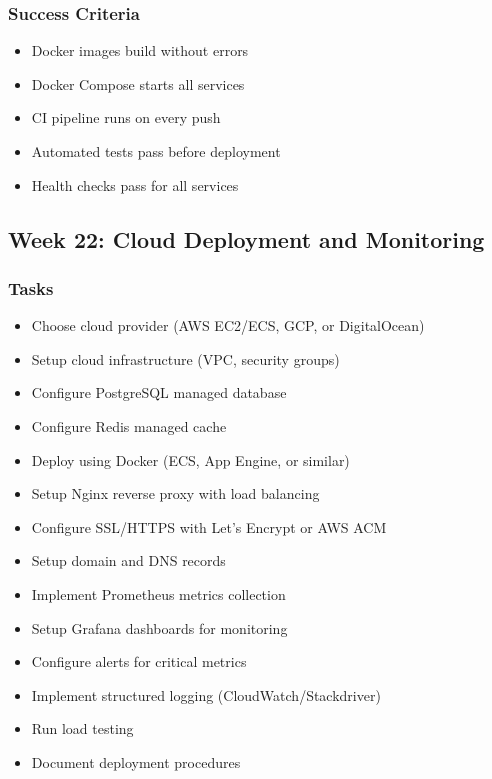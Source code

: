 \documentclass[12pt,oneside]{report}
\begin{document}
\subsubsection{Success Criteria}

\begin{itemize}
    \item Docker images build without errors
    \item Docker Compose starts all services
    \item CI pipeline runs on every push
    \item Automated tests pass before deployment
    \item Health checks pass for all services
\end{itemize}

\subsection{Week 22: Cloud Deployment and Monitoring}

\subsubsection{Tasks}

\begin{itemize}
    \item Choose cloud provider (AWS EC2/ECS, GCP, or DigitalOcean)
    \item Setup cloud infrastructure (VPC, security groups)
    \item Configure PostgreSQL managed database
    \item Configure Redis managed cache
    \item Deploy using Docker (ECS, App Engine, or similar)
    \item Setup Nginx reverse proxy with load balancing
    \item Configure SSL/HTTPS with Let's Encrypt or AWS ACM
    \item Setup domain and DNS records
    \item Implement Prometheus metrics collection
    \item Setup Grafana dashboards for monitoring
    \item Configure alerts for critical metrics
    \item Implement structured logging (CloudWatch/Stackdriver)
    \item Run load testing
    \item Document deployment procedures
\end{itemize}
\end{document}
